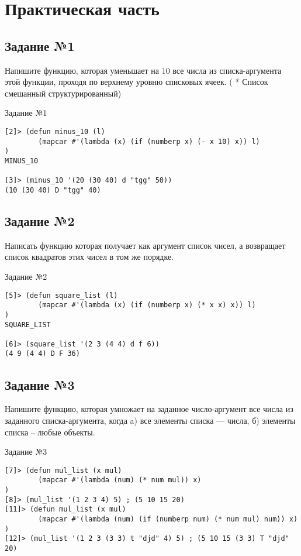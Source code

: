 \setcounter{page}{3}

\chapter{Практическая часть}
\section{Задание №1}
Напишите функцию, которая уменьшает на 10 все числа из списка-аргумента этой
функции, проходя по верхнему уровню списковых ячеек. ( * Список смешанный структурированный)
  
\begin{code}
\caption{Задание №1}
\label{code:bf2}
\begin{verbatim}
[2]> (defun minus_10 (l)
        (mapcar #'(lambda (x) (if (numberp x) (- x 10) x)) l)
)
MINUS_10

[3]> (minus_10 '(20 (30 40) d "tgg" 50))
(10 (30 40) D "tgg" 40)
\end{verbatim}
\end{code}

\section{Задание №2}
Написать функцию которая получает как аргумент список чисел, а возвращает список квадратов этих чисел в том же порядке.

\begin{code}
\caption{Задание №2}
\label{code:bf2}
\begin{verbatim}
[5]> (defun square_list (l)
        (mapcar #'(lambda (x) (if (numberp x) (* x x) x)) l)
)
SQUARE_LIST

[6]> (square_list '(2 3 (4 4) d f 6))
(4 9 (4 4) D F 36)
\end{verbatim}
\end{code}

\section{Задание №3}
Напишите функцию, которая умножает на заданное число-аргумент все числа из заданного списка-аргумента, когда
a) все элементы списка --- числа,
б) элементы списка -- любые объекты.

\begin{code}
\caption{Задание №3}
\label{code:bf3}
\begin{verbatim}
[7]> (defun mul_list (x mul)
        (mapcar #'(lambda (num) (* num mul)) x)
)
[8]> (mul_list '(1 2 3 4) 5) ; (5 10 15 20)
[11]> (defun mul_list (x mul)
        (mapcar #'(lambda (num) (if (numberp num) (* num mul) num)) x)
)
[12]> (mul_list '(1 2 3 (3 3) t "djd" 4) 5) ; (5 10 15 (3 3) T "djd" 20)
\end{verbatim}
\end{code}

